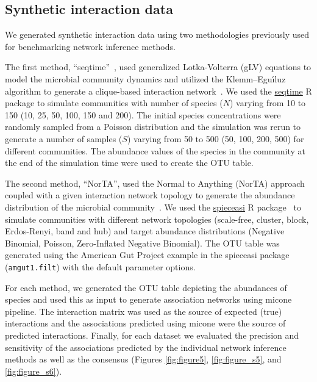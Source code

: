 \documentclass[letterpaper,12pt]{article}
\begin{document}
  \subsection*{Synthetic interaction data}
  \vspace{-5mm}
  We generated synthetic interaction data using two methodologies previously used for benchmarking network inference methods.

  The first method, ``seqtime''~\cite{faustSignaturesEcologicalProcesses2018}, used generalized Lotka-Volterra (gLV) equations to model the microbial community dynamics and utilized the Klemm–Eguı́luz algorithm to generate a clique-based interaction network~\cite{Rottjers2018}.
  We used the \href{https://github.com/hallucigenia-sparsa/seqtime}{seqtime} R package to simulate communities with number of species ($N$) varying from 10 to 150 (10, 25, 50, 100, 150 and 200).
  The initial species concentrations were randomly sampled from a Poisson distribution and the simulation was rerun to generate a number of samples ($S$) varying from 50 to 500 (50, 100, 200, 500) for different communities.
  The abundance values of the species in the community at the end of the simulation time were used to create the OTU table.

  The second method, ``NorTA'', used the Normal to Anything (NorTA) approach coupled with a given interaction network topology to generate the abundance distribution of the microbial community~\cite{Kurtz2015}.
  We used the \href{https://github.com/zdk123/SpiecEasi}{spieceasi} R package~\cite{Kurtz2015} to simulate communities with different network topologies (scale-free, cluster, block, Erdos-Renyi, band and hub) and target abundance distributions (Negative Binomial, Poisson, Zero-Inflated Negative Binomial).
  The OTU table was generated using the American Gut Project example in the spieceasi package (\texttt{amgut1.filt}) with the default parameter options.

  For each method, we generated the OTU table depicting the abundances of species and used this as input to generate association networks using \ac{micone} pipeline.
  The interaction matrix was used as the source of expected (true) interactions and the associations predicted using \ac{micone} were the source of predicted interactions.
  Finally, for each dataset we evaluated the precision and sensitivity of the associations predicted by the individual network inference methods as well as the consensus (Figures \ref{fig:figure5}, \ref{fig:figure_s5}, and \ref{fig:figure_s6}).
\end{document}
